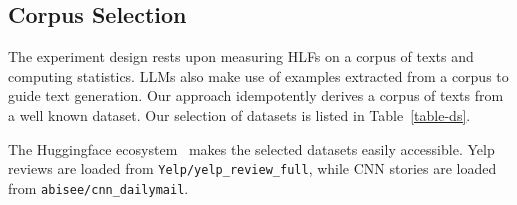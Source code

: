 \documentclass[11pt]{article}
\begin{document}
\subsection{Corpus Selection}\label{ds-selection}

The experiment design rests upon measuring HLFs on a corpus of texts and
computing statistics.
LLMs also make use of examples extracted from a corpus to guide text generation.
Our approach idempotently derives a corpus of texts from a well known dataset.
Our selection of datasets is listed in Table~\ref{table-ds}.

\begin{table}[ht]
    \setlength\tabcolsep{6pt}
    \centering
    \caption{Source Datasets}\label{table-ds}
\end{table}

The Huggingface ecosystem~\cite{lhoest-etal-2021-datasets} makes the selected
datasets easily accessible.
Yelp reviews are loaded from \texttt{Yelp/yelp\_review\_full}, while CNN stories
are loaded from \texttt{abisee/cnn\_dailymail}.
\end{document}
